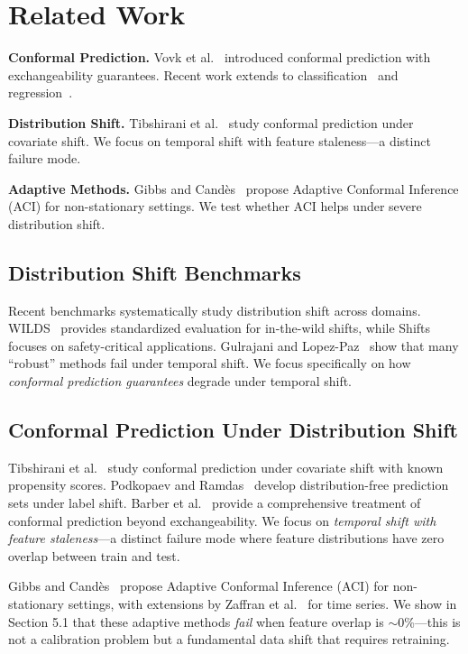 \documentclass[sigconf]{acmart}
\begin{document}
\section{Related Work}

\textbf{Conformal Prediction.} Vovk et al.~\cite{vovk2005algorithmic} introduced conformal prediction with exchangeability guarantees. Recent work extends to classification~\cite{romano2020classification} and regression~\cite{romano2019conformalized}.

\textbf{Distribution Shift.} Tibshirani et al.~\cite{tibshirani2019conformal} study conformal prediction under covariate shift. We focus on temporal shift with feature staleness---a distinct failure mode.

\textbf{Adaptive Methods.} Gibbs and Cand\`es~\cite{gibbs2021adaptive} propose Adaptive Conformal Inference (ACI) for non-stationary settings. We test whether ACI helps under severe distribution shift.

\subsection{Distribution Shift Benchmarks}

Recent benchmarks systematically study distribution shift across domains.
WILDS~\cite{koh2021wilds} provides standardized evaluation for in-the-wild shifts,
while Shifts~\cite{malinin2021shifts} focuses on safety-critical applications.
Gulrajani and Lopez-Paz~\cite{gulrajani2020search} show that many ``robust''
methods fail under temporal shift. We focus specifically on how
\textit{conformal prediction guarantees} degrade under temporal shift.

\subsection{Conformal Prediction Under Distribution Shift}

Tibshirani et al.~\cite{tibshirani2019conformal} study conformal prediction
under covariate shift with known propensity scores. Podkopaev and
Ramdas~\cite{podkopaev2021distribution} develop distribution-free prediction
sets under label shift. Barber et al.~\cite{barber2023conformal} provide a
comprehensive treatment of conformal prediction beyond exchangeability.
We focus on \textit{temporal shift with feature staleness}---a distinct failure
mode where feature distributions have zero overlap between train and test.

Gibbs and Cand\`es~\cite{gibbs2021adaptive} propose Adaptive Conformal Inference
(ACI) for non-stationary settings, with extensions by Zaffran et
al.~\cite{zaffran2022adaptive} for time series. We show in Section 5.1
that these adaptive methods \textit{fail} when feature overlap is $\sim$0\%---this
is not a calibration problem but a fundamental data shift that requires retraining.
\end{document}
